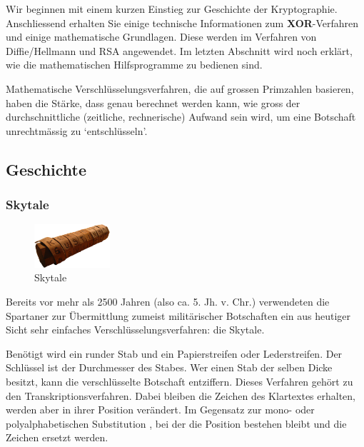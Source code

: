 Wir beginnen mit einem kurzen Einstieg zur Geschichte der Kryptographie.
Anschliessend erhalten Sie einige technische Informationen zum \textbf{XOR}-Verfahren
 und einige
mathematische Grundlagen. Diese werden im Verfahren von Diffie/Hellmann und
RSA  angewendet.
Im letzten Abschnitt  wird noch erklärt, wie die mathematischen
Hilfsprogramme zu bedienen sind.

Mathematische Verschlüsselungsverfahren, die auf grossen Primzahlen basieren,
haben die Stärke, dass genau berechnet werden kann, wie gross der durchschnittliche
(zeitliche, rechnerische) Aufwand sein wird, um eine Botschaft unrechtmässig
zu `entschlüsseln'.

\subsection{Geschichte}
\subsubsection*{Skytale}

\begin{figure}
    \begin{center}
        \includegraphics[width=0.25\textwidth]{images/Skytale.png}
    \end{center}
    \caption{Skytale}
\end{figure}

Bereits vor mehr als 2500 Jahren (also ca. 5. Jh. v. Chr.) verwendeten die
Spartaner zur Übermittlung zumeist militärischer Botschaften ein aus heutiger
Sicht sehr einfaches Verschlüsselungsverfahren: die Skytale.


Benötigt wird ein runder Stab und ein Papierstreifen oder Lederstreifen.
Der Schlüssel ist der Durchmesser des Stabes. Wer einen Stab der selben
Dicke besitzt, kann die verschlüsselte Botschaft entziffern. Dieses
Verfahren gehört zu den Transkriptionsverfahren. Dabei bleiben die
Zeichen des Klartextes erhalten, werden aber in ihrer Position verändert.
Im Gegensatz zur mono- oder polyalphabetischen Substitution
, bei der die
Position bestehen bleibt und die Zeichen ersetzt werden.

